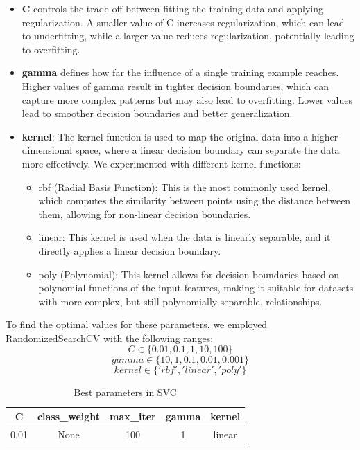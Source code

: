 \begin{itemize}
    \item \textbf{C} controls the trade-off between fitting the training data and applying regularization. A smaller value of C increases regularization, which can lead to underfitting, while a larger value reduces regularization, potentially leading to overfitting.
    \item \textbf{gamma} defines how far the influence of a single training example reaches. Higher values of gamma result in tighter decision boundaries, which can capture more complex patterns but may also lead to overfitting. Lower values lead to smoother decision boundaries and better generalization.
    \item \textbf{kernel}: The kernel function is used to map the original data into a higher-dimensional space, where a linear decision boundary can separate the data more effectively. We experimented with different kernel functions:
\begin{itemize}
    \item rbf (Radial Basis Function): This is the most commonly used kernel, which computes the similarity between points using the distance between them, allowing for non-linear decision boundaries.
    \item linear: This kernel is used when the data is linearly separable, and it directly applies a linear decision boundary.
    \item poly (Polynomial): This kernel allows for decision boundaries based on polynomial functions of the input features, making it suitable for datasets with more complex, but still polynomially separable, relationships.
\end{itemize}
\end{itemize}

To find the optimal values for these parameters, we employed RandomizedSearchCV with the following ranges:
\begin{equation}
C \in \{0.01, 0.1, 1, 10, 100\}
\end{equation}
\begin{equation}
gamma \in \{10, 1, 0.1, 0.01, 0.001\}
\end{equation}
\begin{equation}
kernel \in \{'rbf','linear','poly'\}
\end{equation}


\begin{table}[ht]
    \centering
    \caption{Best parameters in SVC} 
    \begin{tabular}{||c c c c c||} 
     \hline
     C & class\_weight & max\_iter & gamma & kernel \\ [0.5ex] 
     \hline\hline
     0.01 & None & 100 & 1 & linear\\ 
    \hline
    \end{tabular}
    \label{tab:tab2_svc}
\end{table}


